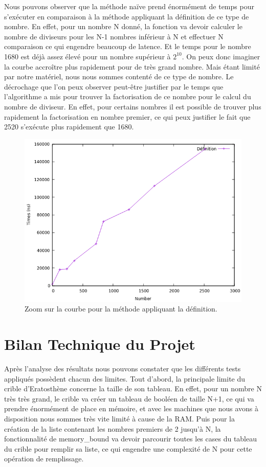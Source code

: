 Nous pouvons observer que la méthode naïve prend énormément de temps pour s'exécuter en comparaison à la méthode appliquant la définition de ce type de nombre. En effet, pour un nombre N donné, la fonction va devoir calculer le nombre de diviseurs pour les N-1 nombres inférieur à N et effectuer N comparaison ce qui engendre beaucoup de latence. Et le temps pour le nombre 1680 est déjà assez élevé  pour un nombre supérieur à $2^{10}$. On peux donc imaginer la courbe accroître plus rapidement pour de très grand nombre. Mais étant limité par notre matériel, nous nous sommes contenté de ce type de nombre. Le décrochage que l'on peux observer peut-être justifier par le temps que l'algorithme a mis pour trouver la factorisation de ce nombre pour le calcul du nombre de diviseur. En effet, pour certains nombres il est possible de trouver plus rapidement la factorisation en nombre premier, ce qui peux justifier le fait que 2520 s'exécute plus rapidement que 1680.
	\begin{figure}[!ht]	
		\begin{center}\includegraphics[scale=0.6]{HCdef.png}\end{center}
		\caption{Zoom sur la courbe pour la méthode appliquant la définition.}
		\label{fg:HCdef}
	\end{figure}
	\section{Bilan Technique du Projet}	
		Après l'analyse des résultats nous pouvons constater que les différents tests appliqués possèdent chacun des limites.	
		Tout d'abord, la principale limite du crible d'Eratosthène concerne la taille de son tableau. En effet, pour un nombre N très très grand, le crible va créer un tableau de booléen de taille N+1, ce qui va prendre énormément de place en mémoire, et avec les machines que nous avons à disposition nous sommes très vite limité à cause de la RAM. Puis pour la création de la liste contenant les nombres premiers de 2 jusqu'à N, la fonctionnalité de memory\_bound va devoir parcourir toutes les cases du tableau du crible pour remplir sa liste, ce qui engendre une complexité de N pour cette opération de remplissage.\\
		
